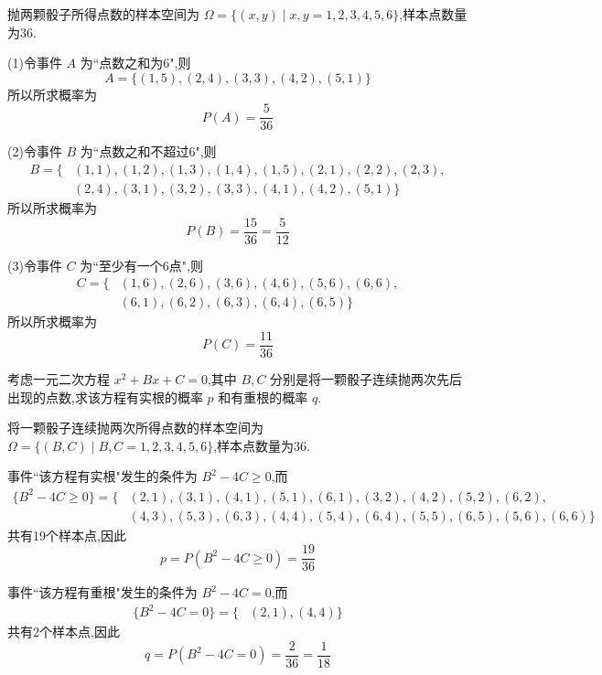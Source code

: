 \begin{solution}
    抛两颗骰子所得点数的样本空间为 $\varOmega = \{ (x,y) \mid x,y=1,2,3,4,5,6 \}$,样本点数量为36.

    (1)令事件 $A$ 为``点数之和为6",则
    $$
    A = \{ (1,5), (2,4), (3,3), (4,2), (5,1) \}
    $$
    所以所求概率为
    $$
    P(A) = \dfrac{5}{36}
    $$

    (2)令事件 $B$ 为``点数之和不超过6",则
    $$
    \begin{aligned}
        B = \{ & (1,1), (1,2), (1,3), (1,4), (1,5), (2,1), (2,2), (2,3), \\
        & (2,4), (3,1), (3,2), (3,3), (4,1), (4,2), (5,1) \}
    \end{aligned}
    $$
    所以所求概率为
    $$
    P(B) = \dfrac{15}{36} = \dfrac{5}{12}
    $$

    (3)令事件 $C$ 为``至少有一个6点",则
    $$
    \begin{aligned}
        C = \{ & (1,6), (2,6), (3,6), (4,6), (5,6), (6,6), \\
        & (6,1), (6,2), (6,3), (6,4), (6,5) \}
    \end{aligned}
    $$
    所以所求概率为
    $$
    P(C) = \dfrac{11}{36}
    $$
\end{solution}

\question 考虑一元二次方程 $x^2 + Bx + C = 0$,其中 $B,C$ 分别是将一颗骰子连续抛两次先后出现的点数,求该方程有实根的概率 $p$ 和有重根的概率 $q$.

\begin{solution}
    将一颗骰子连续抛两次所得点数的样本空间为 $\varOmega = \{ (B,C) \mid B,C=1,2,3,4,5,6 \}$,样本点数量为36.
    
    事件``该方程有实根"发生的条件为 $B^2 - 4C \geqslant 0$,而
    $$
    \begin{aligned}
        \{ B^2 - 4C \geqslant 0 \} = \{ & (2,1), (3,1), (4,1), (5,1), (6,1), (3,2), (4,2), (5,2), (6,2), \\
        & (4,3), (5,3), (6,3), (4,4), (5,4), (6,4), (5,5), (6,5), (5,6), (6,6) \}
    \end{aligned}
    $$
    共有19个样本点,因此
    $$
    p = P(B^2 - 4C \geqslant 0) = \dfrac{19}{36}
    $$

    事件``该方程有重根"发生的条件为 $B^2 - 4C = 0$,而
    $$
    \begin{aligned}
        \{ B^2 - 4C = 0 \} = \{ & (2,1), (4,4) \}
    \end{aligned}
    $$
    共有2个样本点,因此
    $$
    q = P(B^2 - 4C = 0) = \dfrac{2}{36} = \dfrac{1}{18}
    $$
\end{solution}

